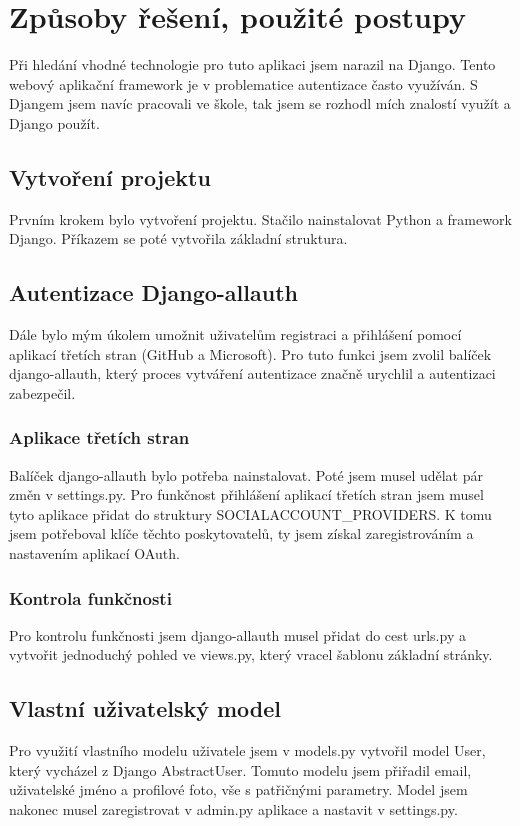 \documentclass[12pt, a4paper,
twoside,        %
openright
]{report}
\begin{document}
\chapter{Způsoby řešení, použité postupy}
Při hledání vhodné technologie pro tuto aplikaci jsem narazil na Django. Tento webový aplikační framework je v problematice autentizace často využíván. S Djangem jsem navíc pracovali ve škole, tak jsem se rozhodl mích znalostí využít a Django použít.

\section{Vytvoření projektu}
\label{sec:vytvoreniprojektu}
Prvním krokem bylo vytvoření projektu. Stačilo nainstalovat Python a framework Django. Příkazem se poté vytvořila základní struktura.

\section{Autentizace Django-allauth}
\label{sec:autentizacedjango-allauth}
Dále bylo mým úkolem umožnit uživatelům registraci a přihlášení pomocí aplikací třetích stran (GitHub a Microsoft). Pro tuto funkci jsem zvolil balíček django-allauth, který proces vytváření autentizace značně urychlil a autentizaci zabezpečil.

\subsection{Aplikace třetích stran}
Balíček django-allauth bylo potřeba nainstalovat. Poté jsem musel udělat pár změn v settings.py. Pro funkčnost přihlášení aplikací třetích stran jsem musel tyto aplikace přidat do struktury SOCIALACCOUNT\_PROVIDERS. K tomu jsem potřeboval klíče těchto poskytovatelů, ty jsem získal zaregistrováním a nastavením aplikací OAuth.

\subsection{Kontrola funkčnosti}
Pro kontrolu funkčnosti jsem django-allauth musel přidat do cest urls.py a vytvořit jednoduchý pohled ve views.py, který vracel šablonu základní stránky.

\newpage

\section{Vlastní uživatelský model}
\label{sec:vlastniuzivatelskymodel}
Pro využití vlastního modelu uživatele jsem v models.py vytvořil model User, který vycházel z Django AbstractUser. Tomuto modelu jsem přiřadil email, uživatelské jméno a profilové foto, vše s patřičnými parametry. Model jsem nakonec musel zaregistrovat v admin.py aplikace a nastavit v settings.py.
\end{document}
